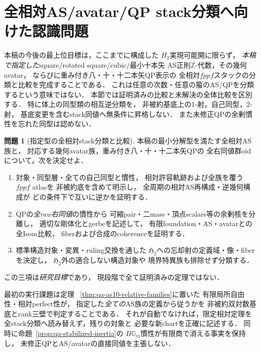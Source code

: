 \documentclass[a4paper,11pt]{ltjsarticle}
\numberwithin{equation}{section}
\theoremstyle{plain}
\theoremstyle{definition}
\newtheorem{problem}[theorem]{問題}
\theoremstyle{remark}
\newcommand{\HHstack}{\mathfrak H_2}
\begin{document}
\section{全相対AS/avatar/QP stack分類へ向けた認識問題}
\label{sec:qa-remaining}

本稿の今後の最上位目標は，ここまでに構成した
$H_2$実現可能開に限らず，
\emph{本稿で指定した}square/rotated square/cubic/最小十本矢
AS正則$\mathbb Z$-代数，その幾何avatar，
ならびに重み付き八・十・十二本矢QP表示の
全相対$fppf$スタックの分類と比較を完成することである．
これは任意の次数・任意の箙のAS/QPを分類するという意味ではない．
本節では証明済みの比較と未解決の全体比較を区別する．
特に体上の同型類の相互逆分類を，
非被約基底上の$1$-射，自己同型，$2$-射，
基底変更を含むstack同値へ無条件に昇格しない．
また未修正QPの余剰慣性を忘れた同型は認めない．

\begin{problem}[指定型の全相対stack分類と比較]
\label{prob:qa-all-relative-as-avatar-qp-stacks}
本稿の最小分解型を満たす全相対AS族と，
対応する幾何avatar族，重み付き八・十・十二本矢QPの
全右同値群oidについて，次を決定せよ．
\begin{enumerate}
\item
対象・同型層・全ての自己同型と慣性，
相対許容軌跡および全族を覆う$fppf$ atlasを
非被約底を含めて明示し，
全周期の相対AS再構成・逆幾何構成が
どの条件下で互いに逆かを証明する．
\item
QPの\emph{全raw右同値}の慣性から
可縮pair・二mass・頂点scalars等の余剰核を分離し，
適切な剛体化とgerbeを記述して，
有限foundation・AS・avatarとの全Isom比較，
fiberおよび合成のcoherenceを証明する．
\item
標準構造対象・変異・ruling交換を通した
$\HHstack$への忘却射の定義域・像・fiberを決定し，
$\HHstack$外の適合しない構造対象や
境界特異族も排除せず分類する．
\end{enumerate}
この三項は\emph{研究目標}であり，
現段階で全て証明済みの定理ではない．
\end{problem}

最初の実行課題は定理~
\ref{thm:qa-as10-relative-families}に置いた
有限局所自由性・相対perfect性が，
指定した\emph{全ての}AS族の定義から従うかを
非被約双対数基底とrank三壁で判定することである．
それが自動でなければ，限定相対定理を
全stack分類へ読み替えず，残りの対象と
必要な新chartを正確に記述する．
同時に命題~\ref{prop:qa-stabilized-inertia}の
$B\mathbb G_m$慣性が有限商で消える事実を保持し，
未修正QPとAS/avatarの直接同値を主張しない．
\end{document}
